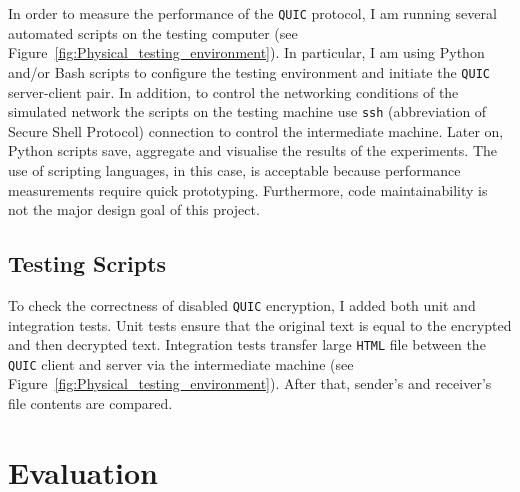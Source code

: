 \documentclass[12pt,a4paper,twoside,openright]{report}
\begin{document}
In order to measure the performance of the \texttt{QUIC} protocol, I am running several automated scripts on the testing computer (see Figure~\ref{fig:Physical_testing_environment}).
In particular, I am using Python and/or Bash scripts to configure the testing environment and initiate the \texttt{QUIC} server-client pair.
In addition, to control the networking conditions of the simulated network the scripts on the testing machine use \texttt{ssh} (abbreviation of Secure Shell Protocol) connection to control the intermediate machine.
Later on, Python scripts save, aggregate and visualise the results of the experiments.
The use of scripting languages, in this case, is acceptable because performance measurements require quick prototyping.
Furthermore, code maintainability is not the major design goal of this project.



\section{Testing Scripts}

To check the correctness of disabled \texttt{QUIC} encryption, I added both unit and integration tests.
Unit tests ensure that the original text is equal to the encrypted and then decrypted text.
Integration tests transfer large \texttt{HTML} file between the \texttt{QUIC} client and server via the intermediate machine (see Figure~\ref{fig:Physical_testing_environment}).
After that, sender's and receiver's file contents are compared.


\chapter{Evaluation}

\end{document}
